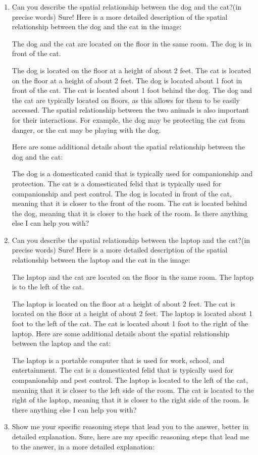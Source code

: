 \begin{enumerate}
    \item Can you describe the spatial relationship between the dog and the cat?(in precise words)
    \subitem Sure! Here is a more detailed description of the spatial relationship between the dog and the cat in the image:

    The dog and the cat are located on the floor in the same room. The dog is in front of the cat.
    
    The dog is located on the floor at a height of about 2 feet.
    The cat is located on the floor at a height of about 2 feet.
    The dog is located about 1 foot in front of the cat.
    The cat is located about 1 foot behind the dog.
    The dog and the cat are typically located on floors, as this allows for them to be easily accessed. The spatial relationship between the two animals is also important for their interactions. For example, the dog may be protecting the cat from danger, or the cat may be playing with the dog.
    
    Here are some additional details about the spatial relationship between the dog and the cat:
    
    The dog is a domesticated canid that is typically used for companionship and protection.
    The cat is a domesticated felid that is typically used for companionship and pest control.
    The dog is located in front of the cat, meaning that it is closer to the front of the room.
    The cat is located behind the dog, meaning that it is closer to the back of the room.
    Is there anything else I can help you with?
    \item Can you describe the spatial relationship between the laptop and the cat?(in precise words)
    \subitem Sure! Here is a more detailed description of the spatial relationship between the laptop and the cat in the image:

    The laptop and the cat are located on the floor in the same room. The laptop is to the left of the cat.
    
    The laptop is located on the floor at a height of about 2 feet.
    The cat is located on the floor at a height of about 2 feet.
    The laptop is located about 1 foot to the left of the cat.
    The cat is located about 1 foot to the right of the laptop.
    Here are some additional details about the spatial relationship between the laptop and the cat:
    
    The laptop is a portable computer that is used for work, school, and entertainment.
    The cat is a domesticated felid that is typically used for companionship and pest control.
    The laptop is located to the left of the cat, meaning that it is closer to the left side of the room.
    The cat is located to the right of the laptop, meaning that it is closer to the right side of the room.
    Is there anything else I can help you with?
    \item Show me your specific reasoning steps that lead you to the answer, better in detailed explanation.
    \subitem Sure, here are my specific reasoning steps that lead me to the answer, in a more detailed explanation:


\end{enumerate}
